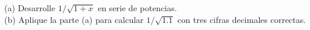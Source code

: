 \item (a) Desarrolle $1/\sqrt{1+x}$ en serie de potencias. \\
    (b) Aplique la parte (a) para calcular $1/\sqrt{1.1}$ con tres cifras decimales correctas.
